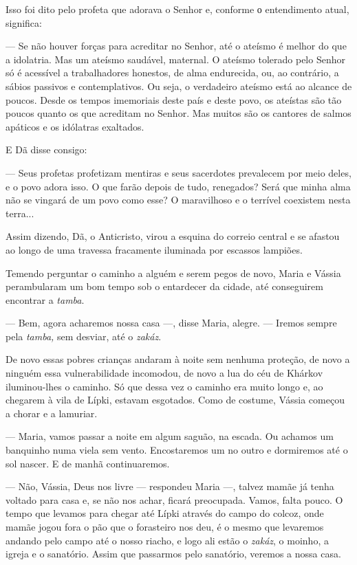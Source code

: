 Isso foi dito pelo profeta que adorava o Senhor e, conforme о
entendimento atual, significa:

--- Se não houver forças para acreditar no Senhor, até o ateísmo é
melhor do que a idolatria. Mas um ateísmo saudável, maternal. O ateísmo
tolerado pelo Senhor só é acessível a trabalhadores honestos, de alma
endurecida, ou, ao contrário, a sábios passivos e contemplativos. Ou
seja, o verdadeiro ateísmo está ao alcance de poucos. Desde os tempos
imemoriais deste país e deste povo, os ateístas são tão poucos quanto os
que acreditam no Senhor. Mas muitos são os cantores de salmos apáticos e
os idólatras exaltados.

E Dã disse consigo:

--- Seus profetas profetizam mentiras e seus sacerdotes prevalecem por
meio deles, e o povo adora isso. O que farão depois de tudo, renegados?
Será que minha alma não se vingará de um povo como esse? O maravilhoso e
o terrível coexistem nesta terra...

Assim dizendo, Dã, o Anticristo, virou a esquina do correio central e se
afastou ao longo de uma travessa fracamente iluminada por escassos
lampiões.

Temendo perguntar o caminho a alguém e serem pegos de novo, Maria e
Vássia perambularam um bom tempo sob o entardecer da cidade, até
conseguirem encontrar a \emph{tamba}.

--- Bem, agora acharemos nossa casa ---, disse Maria, alegre. --- Iremos
sempre pela \emph{tamba,} sem desviar, até o \emph{zakáz}.

De novo essas pobres crianças andaram à noite sem nenhuma proteção, de
novo a ninguém essa vulnerabilidade incomodou, de novo a lua do céu de
Khárkov iluminou-lhes o caminho. Só que dessa vez o caminho era muito
longo e, ao chegarem à vila de Lípki, estavam esgotados. Como de
costume, Vássia começou a chorar e a lamuriar.

--- Maria, vamos passar a noite em algum saguão, na escada. Ou achamos
um banquinho numa viela sem vento. Encostaremos um no outro e dormiremos
até o sol nascer. E de manhã continuaremos.

--- Não, Vássia, Deus nos livre --- respondeu Maria ---, talvez mamãe já
tenha voltado para casa e, se não nos achar, ficará preocupada. Vamos,
falta pouco. O tempo que levamos para chegar até Lípki através do campo
do colcoz, onde mamãe jogou fora o pão que o forasteiro nos deu, é o
mesmo que levaremos andando pelo campo até o nosso riacho, e logo ali
estão o \emph{zakáz}, o moinho, a igreja e o sanatório. Assim que
passarmos pelo sanatório, veremos a nossa casa.

